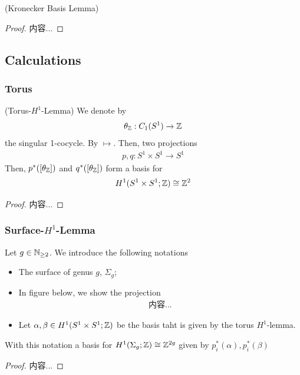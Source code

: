 \documentclass[Total.tex]{subfiles}
\begin{document}
						\begin{lemma}
							(Kronecker Basis Lemma)
						\end{lemma}
						\begin{proof}
							内容...
						\end{proof}
				\subsection{Calculations}
					\subsubsection{Torus}
						\begin{lemma}
							(Torus-$H^1$-Lemma) We denote by
							\begin{gather*}
								\theta_{\mathbb{Z}}:C_1(S^1)\rightarrow \mathbb{Z}
							\end{gather*}
							the singular 1-cocycle. By $\mapsto$. Then, two projections
							\begin{gather*}
								p,q:S^1\times S^1\rightarrow S^1
							\end{gather*}
							Then, $p^*([\theta_{\mathbb{Z}}])$ and $q^*([\theta_{\mathbb{Z}}])$ form a basis for
							\begin{gather*}
								H^1(S^1\times S^1;\mathbb{Z})\cong \mathbb{Z}^2
							\end{gather*}
						\end{lemma}
						\begin{proof}
							内容...
						\end{proof}
					\subsubsection{Surface-$H^1$-Lemma}
						\begin{lemma}
							Let $g\in \mathbb{N}_{\geq 2}$. We introduce the following notations
							\begin{itemize}
								\item The surface of genus $g$, $\Sigma_g$;
								\item In figure below, we show the projection
								\begin{gather*}
									内容...
								\end{gather*}
								\item Let $\alpha,\beta\in H^1(S^1\times S^1;\mathbb{Z})$ be the basis taht is given by the torus $H^1$-lemma.
							\end{itemize}
							With this notation a basis for $H^1(\Sigma_g;\mathbb{Z})\cong \mathbb{Z}^{2g}$ given by $p_i^*(\alpha),p_i^*(\beta)$
						\end{lemma}
						\begin{proof}
							内容...
						\end{proof}
					
\end{document}

